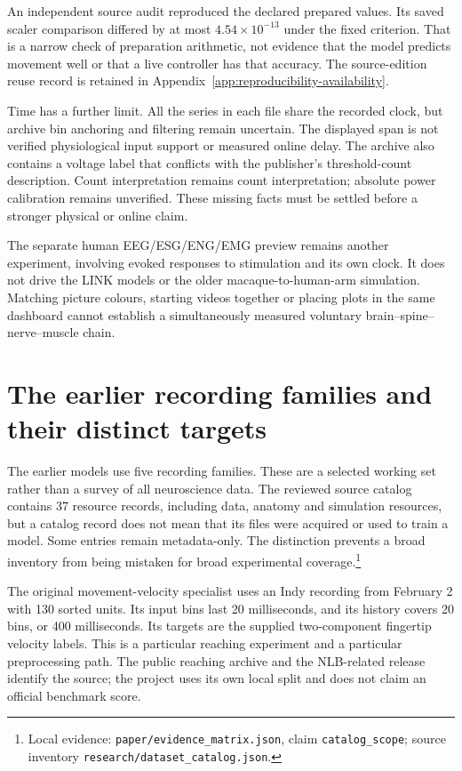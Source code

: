 An independent source audit reproduced the declared prepared values. Its saved scaler comparison differed by at most $4.54\times10^{-13}$ under the fixed criterion. That is a narrow check of preparation arithmetic, not evidence that the model predicts movement well or that a live controller has that accuracy. The source-edition reuse record is retained in Appendix~\ref{app:reproducibility-availability}.

Time has a further limit. All the series in each file share the recorded clock,
but archive bin anchoring and filtering remain uncertain. The displayed span
is not verified physiological input support or measured online delay. The
archive also contains a voltage label that conflicts with the publisher's
threshold-count description. Count interpretation remains count interpretation;
absolute power calibration remains unverified. These missing facts must be
settled before a stronger physical or online claim.

The separate human EEG/ESG/ENG/EMG preview remains another experiment, involving
evoked responses to stimulation and its own clock. It does not drive the LINK
models or the older macaque-to-human-arm simulation. Matching picture colours,
starting videos together or placing plots in the same dashboard cannot establish
a simultaneously measured voluntary brain--spine--nerve--muscle chain.


\section{The earlier recording families and their distinct targets}

The earlier models use five recording families. These are a selected working set rather than a survey of all neuroscience data. The reviewed source catalog contains 37 resource records, including data, anatomy and simulation resources, but a catalog record does not mean that its files were acquired or used to train a model. Some entries remain metadata-only. The distinction prevents a broad inventory from being mistaken for broad experimental coverage.\footnote{Local evidence: \texttt{paper/evidence\_matrix.json}, claim \texttt{catalog\_scope}; source inventory \texttt{\mbox{research}/\allowbreak{}\mbox{dataset}\_\allowbreak{}\mbox{catalog}.\allowbreak{}\mbox{json}}.}

The original movement-velocity specialist uses an Indy recording from February 2 with 130 sorted units. Its input bins last 20 milliseconds, and its history covers 20 bins, or 400 milliseconds. Its targets are the supplied two-component fingertip velocity labels. This is a particular reaching experiment and a particular preprocessing path. The public reaching archive and the NLB-related release identify the source; the project uses its own local split and does not claim an official benchmark score.\cite{odoherty2020,nlb2021}

